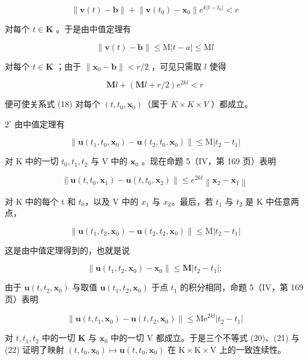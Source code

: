 \[
\left\| \mathbf {v} (t) - \mathbf {b} \right\| + \left\| \mathbf {v} (t _ {0}) - \mathbf {x} _ {0} \right\| e ^ {k | t - t _ {0} |} <   r\tag{18}
\]

对每个 \(t \in \mathbf{K}\) 。于是由中值定理有

\[
\| \mathbf {v} (t) - \mathbf {b} \| \leqslant \mathrm{M} | t - a | \leqslant \mathrm{M} l
\]

对每个 \(t \in \mathbf{K}\) ；由于 \(\| \mathbf{x}_0 - \mathbf{b} \| < r / 2\) ，可见只需取 \(l\) 使得

\[
\mathbf {M} l + (\mathbf {M} l + r / 2) e ^ {2 k l} <   r\tag{19}
\]

便可使关系式 (18) 对每个 \((t, t_{0}, \mathbf{x}_{0})\)（属于 \(K \times K \times V\) ）都成立。

\(2^{\circ}\) 由中值定理有

\[
\left\| \mathbf {u} (t _ {1}, t _ {0}, \mathbf {x} _ {0}) - \mathbf {u} (t _ {2}, t _ {0}, \mathbf {x} _ {0}) \right\| \leqslant \mathrm{M} \left| t _ {2} - t _ {1} \right|\tag{20}
\]

对 K 中的一切 \(t_0, t_1, t_2\) 与 V 中的 \(\mathbf{x}_0\) 。现在命题 5（IV，第 169 页）表明

\[
\left\| \mathbf {u} (t, t _ {0}, \mathbf {x} _ {1}) - \mathbf {u} (t, t _ {0}, \mathbf {x} _ {2}) \right\| \leqslant e ^ {2 k t} \left\| \mathbf {x} _ {2} - \mathbf {x} _ {1} \right\|\tag{21}
\]

对 K 中的每个 t 和 \(t_{0}\)，以及 V 中的 \(x_{1}\) 与 \(x_{2}\)。最后，若 \(t_{1}\) 与 \(t_{2}\) 是 K 中任意两点，

\[
\left\| \mathbf {u} \left(t _ {1}, t _ {2}, \mathbf {x} _ {0}\right) - \mathbf {u} \left(t _ {2}, t _ {2}, \mathbf {x} _ {0}\right) \right\| \leqslant \mathrm{M} \left| t _ {2} - t _ {1} \right|
\]

这是由中值定理得到的，也就是说

\[
\left\| \mathbf {u} (t _ {1}, t _ {2}, \mathbf {x} _ {0}) - \mathbf {x} _ {0} \right\| \leqslant \mathbf {M} \left| t _ {2} - t _ {1} \right|;
\]

由于 \(\mathbf{u}(t, t_2, \mathbf{x}_0)\) 与取值 \(\mathbf{u}(t_1, t_2, \mathbf{x}_0)\) 于点 \(t_1\) 的积分相同，命题 5（IV，第 169 页）表明

\[
\left\| \mathbf {u} (t, t _ {1}, \mathbf {x} _ {0}) - \mathbf {u} (t, t _ {2}, \mathbf {x} _ {0}) \right\| \leqslant \mathrm{Me} ^ {2 k l} | t _ {2} - t _ {1} |\tag{22}
\]

对 \(t, t_{1}, t_{2}\) 中的一切 \(\mathbf{K}\) 与 \(\mathbf{x}_{0}\) 中的一切 \(\mathrm{V}\) 都成立。于是三个不等式 (20)、(21) 与 (22) 证明了映射 \((t, t_{0}, \mathbf{x}_{0}) \mapsto \mathbf{u}(t, t_{0}, \mathbf{x}_{0})\) 在 \(\mathrm{K} \times \mathrm{K} \times \mathrm{V}\) 上的一致连续性。

